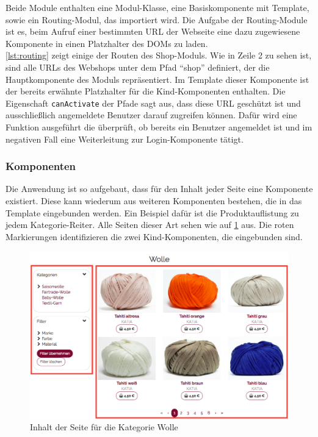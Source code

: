 Beide Module enthalten eine Modul-Klasse, eine Basiskomponente mit Template, sowie ein Routing-Modul, das importiert wird. Die Aufgabe der Routing-Module ist es, beim Aufruf einer bestimmten URL der Webseite eine dazu zugewiesene Komponente in einen Platzhalter des \acs{DOM}s zu laden.
\\


\cref{lst:routing} zeigt einige der Routen des Shop-Moduls. Wie in Zeile 2 zu sehen ist, sind alle URLs des Webshops unter dem Pfad \enquote{shop} definiert, der die Hauptkomponente des Moduls repräsentiert. Im Template dieser Komponente ist der bereits erwähnte Platzhalter für die Kind-Komponenten enthalten. Die Eigenschaft \texttt{canActivate} der Pfade sagt aus, dass diese URL geschützt ist und ausschließlich angemeldete Benutzer darauf zugreifen können. Dafür wird eine Funktion ausgeführt die überprüft, ob bereits ein Benutzer angemeldet ist und im negativen Fall eine Weiterleitung zur Login-Komponente tätigt.

\subsubsection{Komponenten}
Die Anwendung ist so aufgebaut, dass für den Inhalt jeder Seite eine Komponente existiert. Diese kann wiederum aus weiteren Komponenten bestehen, die in das Template eingebunden werden. Ein Beispiel dafür ist die Produktauflistung zu jedem Kategorie-Reiter. Alle Seiten dieser Art sehen wie auf \cref{fig:items_list} aus. Die roten Markierungen identifizieren die zwei Kind-Komponenten, die eingebunden sind.

\begin{figure}[th!]
	\centering
	\includegraphics[width=\linewidth]{bilder/kap7/items}
	\caption{Inhalt der Seite für die Kategorie Wolle}
	\label{fig:items_list}
\end{figure}

